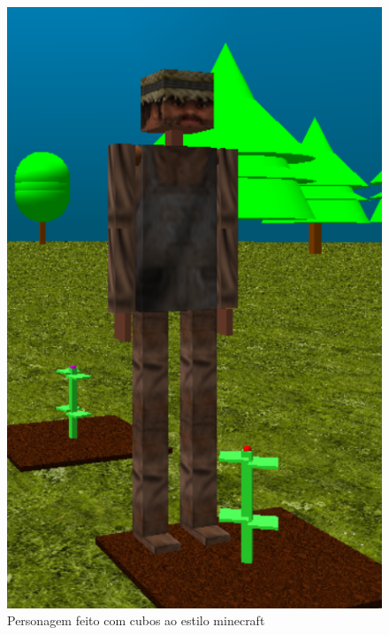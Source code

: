 \documentclass[
	12pt,				%
	openright,			%
	a4paper,			%
	english,			%
	french,				%
	spanish,			%
	brazil,				%
	]{abntex2}
\begin{document}
\begin{figure}[H]
\centering 
\caption{Personagem feito com cubos ao estilo minecraft} \label{personagemfig}
\includegraphics[scale=0.6]{imagens/personagem.png}
\end{figure}
\end{document}
